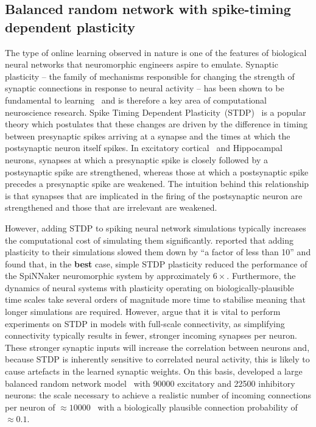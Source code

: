 \documentclass[utf8]{frontiersSCNS} %
\begin{document}
\subsection{Balanced random network with spike-timing dependent plasticity}
\label{sec:method/balanced_random}
The type of  online learning observed in nature is one of the features of biological neural networks that neuromorphic engineers aspire to emulate.
Synaptic plasticity -- the family of mechanisms responsible for changing the strength of synaptic connections in response to neural activity -- has been shown to be fundamental to learning~\citep{Nabavi2014} and is therefore a key area of computational neuroscience research.
Spike Timing Dependent Plasticity~(STDP)~\citep{Markram1997,Bi1998} is a popular theory which postulates that these changes are driven by the difference in timing between presynaptic spikes arriving at a synapse and the times at which the postsynaptic neuron itself spikes.
In excitatory cortical~\citep{Markram1997} and Hippocampal~\citep{Bi1998} neurons, synapses at which a presynaptic spike is closely followed by a postsynaptic spike are strengthened, whereas those at which a postsynaptic spike precedes a presynaptic spike are weakened.
The intuition behind this relationship is that synapses that are implicated in the firing of the postsynaptic neuron are strengthened and those that are irrelevant are weakened.

However, adding STDP to spiking neural network simulations typically increases the computational cost of simulating them significantly. 
\citet{Morrison2007} reported that adding plasticity to their simulations slowed them down by ``a factor of less than 10'' and \citet{Knight2016b} found that, in the \textbf{best} case, simple STDP plasticity reduced the performance of the SpiNNaker neuromorphic system by approximately $6\times$.
Furthermore, the dynamics of neural systems with plasticity operating on biologically-plausible time scales take several orders of magnitude more time to stabilise meaning that longer simulations are required.
However, \citeauthor{Morrison2007} argue that it is vital to perform experiments on STDP in models with full-scale connectivity, as simplifying connectivity typically results in fewer, stronger incoming synapses per neuron.
These stronger synaptic inputs will increase the correlation between neurons and, because STDP is inherently sensitive to correlated neural activity, this is likely to cause artefacts in the learned synaptic weights.
On this basis, \citeauthor{Morrison2007} developed a large balanced random network model~\citep{Brunel2000} with \num{90000} excitatory and \num{22500} inhibitory neurons: the scale necessary to achieve a realistic number of incoming connections per neuron of $\approx 10000$~\citep{braitenberg2013cortex} with a biologically plausible connection probability of $\approx 0.1$.
\end{document}
